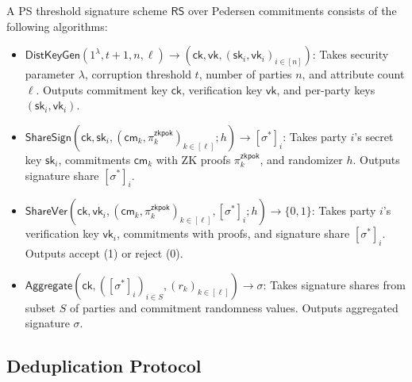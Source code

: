 \begin{definition}
A PS threshold signature scheme $\mathsf{RS}$ over Pedersen commitments consists of the following algorithms:
    \begin{itemize}
        \item $\mathsf{DistKeyGen}(1^\lambda, t+1, n, \ell) \rightarrow (\mathsf{ck}, \mathsf{vk}, (\mathsf{sk}_i, \mathsf{vk}_i)_{i \in [n]})$: Takes security parameter $\lambda$, corruption threshold $t$, number of parties $n$, and attribute count $\ell$. Outputs commitment key $\mathsf{ck}$, verification key $\mathsf{vk}$, and per-party keys $(\mathsf{sk}_i, \mathsf{vk}_i)$.
        
        \item $\mathsf{ShareSign}(\mathsf{ck}, \mathsf{sk}_i, (\mathsf{cm}_k, \pi_k^{\mathsf{zkpok}})_{k \in [\ell]}; h) \rightarrow [\sigma^*]_i$: Takes party $i$'s secret key $\mathsf{sk}_i$, commitments $\mathsf{cm}_k$ with ZK proofs $\pi_k^{\mathsf{zkpok}}$, and randomizer $h$. Outputs signature share $[\sigma^*]_i$.
        
        \item $\mathsf{ShareVer}(\mathsf{ck}, \mathsf{vk}_i, (\mathsf{cm}_k, \pi_k^{\mathsf{zkpok}})_{k \in [\ell]}, [\sigma^*]_i; h) \rightarrow \{0,1\}$: Takes party $i$'s verification key $\mathsf{vk}_i$, commitments with proofs, and signature share $[\sigma^*]_i$. Outputs accept (1) or reject (0).
        
        \item $\mathsf{Aggregate}(\mathsf{ck}, ([\sigma^*]_i)_{i \in S}, (r_k)_{k \in [\ell]}) \rightarrow \sigma$: Takes signature shares from subset $S$ of parties and commitment randomness values. Outputs aggregated signature $\sigma$.
    \end{itemize}
\end{definition}








\subsection{Deduplication Protocol}

